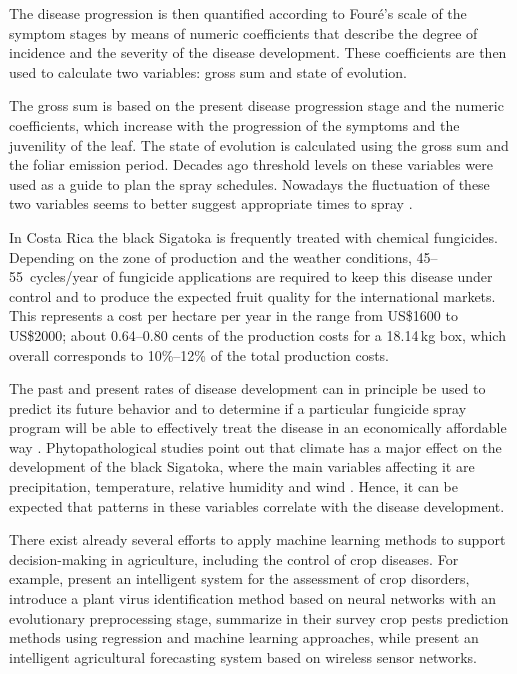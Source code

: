 The disease progression is then quantified according to Fouré's scale
of the symptom stages \citep{foure1988} by means of numeric
coefficients that describe the degree of incidence and the severity of
the disease development.  These coefficients are then used to
calculate two variables: gross sum and state of evolution.

The gross sum is based on the present disease progression stage and
the numeric coefficients, which increase with the progression of
the symptoms and the juvenility of the leaf.
%
The state of evolution is calculated using the gross sum and the
foliar emission period.
%
Decades ago threshold levels on these variables were used as a guide
to plan the spray schedules.  Nowadays the fluctuation of these two
variables seems to better suggest appropriate times to spray
\citep{Marinetal2003}.

In Costa Rica the black Sigatoka is frequently treated with
chemical fungicides.
%
Depending on the zone of production and the weather conditions,
45--55~cycles/year of fungicide applications are required to keep this
disease under control and to produce the expected fruit quality for the
international markets.
%
This represents a cost per hectare per year in the range from US\$1600
to US\$2000; about 0.64--0.80 cents of the production costs for a
18.14\,kg box, which overall corresponds to 10\%--12\% of the total
production costs.

The past and present rates of disease development can in principle be
used to predict its future behavior and to determine if a particular
fungicide spray program will be able to effectively treat the disease
in an economically affordable way \citep{ChuangJeger1987}.
%
Phytopathological studies point out that climate has a major effect on
the development of the black Sigatoka, where the main variables
affecting it are precipitation, temperature, relative humidity and
wind \citep{MarinVargas1995}.  Hence, it can be expected that patterns
in these variables correlate with the disease development.

There exist already several efforts to apply machine learning methods
to support decision-making in agriculture, including the control of
crop diseases. For example, \cite{Camargo2012} present an intelligent
system for the assessment of crop disorders, \cite{Huang2010}
introduce a plant virus identification method based on neural networks
with an evolutionary preprocessing stage, \cite{Kim2014} summarize in
their survey crop pests prediction methods using regression and
machine learning approaches, while \cite{Zhao2013} present an
intelligent agricultural forecasting system based on wireless sensor
networks.

